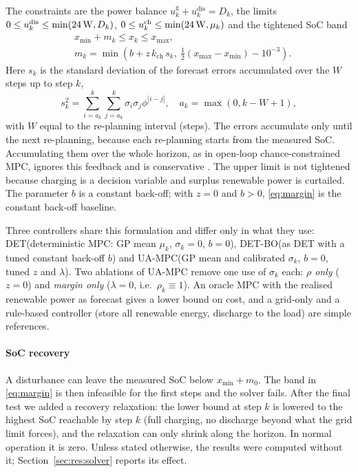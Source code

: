 \documentclass[a4paper,fleqn]{cas-dc}
\newcommand{\DET}{DET\xspace}
\newcommand{\DETBO}{DET-BO\xspace}
\newcommand{\UA}{UA-MPC\xspace}
\begin{document}
The constraints are the power balance $u^{\mathrm{g}}_k+u^{\mathrm{dis}}_k=D_k$, the limits $0\le u^{\mathrm{dis}}_k\le\min(24\,\mathrm{W},D_k)$, $0\le u^{\mathrm{ch}}_k\le\min(24\,\mathrm{W},\mu_k)$ and the tightened SoC band
\begin{align}
&x_{\min}+m_k\le x_k\le x_{\max},\nonumber\\
&m_k=\min\!\left(b+z\,k_{\mathrm{ch}}\,s_k,\ \tfrac{1}{2}(x_{\max}-x_{\min})-10^{-3}\right).\label{eq:margin}
\end{align}
Here $s_k$ is the standard deviation of the forecast errors accumulated over the $W$ steps up to step $k$,
\begin{equation}
s_k^2=\sum_{i=a_k}^{k}\sum_{j=a_k}^{k}\sigma_i\sigma_j\phi^{|i-j|},\quad a_k=\max(0,k-W+1),\label{eq:window}
\end{equation}
with $W$ equal to the re-planning interval (\replansteps steps). The errors accumulate only until the next re-planning, because each re-planning starts from the measured SoC. Accumulating them over the whole horizon, as in open-loop chance-constrained MPC, ignores this feedback and is conservative \cite{mesbah2016stochastic}. The upper limit is not tightened because charging is a decision variable and surplus renewable power is curtailed. The parameter $b$ is a constant back-off; with $z=0$ and $b>0$, \eqref{eq:margin} is the constant back-off baseline.

Three controllers share this formulation and differ only in what they use:
\DET (deterministic MPC: GP mean $\mu_k$, $\sigma_k=0$, $b=0$), \DETBO (as \DET with a tuned constant back-off $b$) and \UA (GP mean and calibrated $\sigma_k$, $b=0$, tuned $z$ and $\lambda$). Two ablations of \UA remove one use of $\sigma_k$ each: \emph{$\rho$ only} ($z=0$) and \emph{margin only} ($\lambda=0$, i.e.\ $\rho_k\equiv1$). An oracle MPC with the realised renewable power as forecast gives a lower bound on cost, and a grid-only and a rule-based controller (store all renewable energy, discharge to the load) are simple references.

\paragraph{SoC recovery} A disturbance can leave the measured SoC below $x_{\min}+m_0$. The band in \eqref{eq:margin} is then infeasible for the first steps and the solver fails. After the final test we added a recovery relaxation: the lower bound at step $k$ is lowered to the highest SoC reachable by step $k$ (full charging, no discharge beyond what the grid limit forces), and the relaxation can only shrink along the horizon. In normal operation it is zero. Unless stated otherwise, the results were computed without it; Section~\ref{sec:res:solver} reports its effect.
\end{document}
